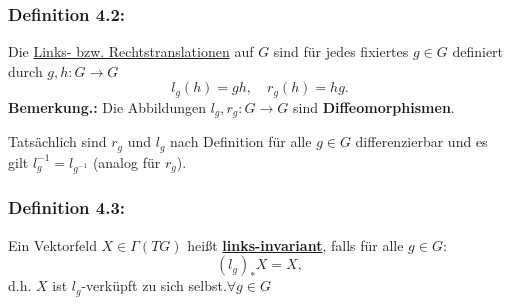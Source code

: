 \documentclass[fleqn, 12pt, letterpaper]{article}
\begin{document}
\subsubsection*{{Definition 4.2:}}
Die \underline{Links- bzw. Rechtstranslationen} auf $G$ sind für jedes fixiertes $g \in G$ definiert durch $g, h:G\rightarrow G$
\[
l_g(h) = gh, \quad r_g(h) = hg.
\]
\textbf{{Bemerkung.:}} 
Die Abbildungen $l_g, r_g: G \rightarrow G$ sind \textbf{Diffeomorphismen}. 

Tatsächlich sind $r_g$ und $l_g$ nach Definition für alle $g \in G$ differenzierbar und es gilt $l_g^{-1} = l_{g^{-1}}$ (analog für $r_g$).

\subsubsection*{{Definition 4.3:}}
Ein Vektorfeld $X \in \Gamma(TG)$ heißt \textbf{\underline{links-invariant}}, falls für alle $g \in G$:
\[
(l_g)_\ast X = X,
\]
d.h. $X$ ist $l_g$-verküpft zu sich selbst.$\forall g\in G$

\end{document}
